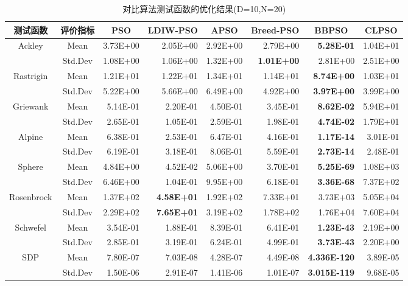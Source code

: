 \begin{table}[htbp]
	\renewcommand\arraystretch{1.1}
	\centering
	\caption{对比算法测试函数的优化结果(D=10,N=20)}
	\label{tabResult1}
	\begin{tabular}{ccrrrrrr}
		\toprule[1.5pt]
		\textbf{测试函数}  & \textbf{评价指标}  & \multicolumn{1}{c}{\textbf{PSO}} & \multicolumn{1}{c}{\textbf{LDIW-PSO}} & \multicolumn{1}{c}{\textbf{APSO}} & \multicolumn{1}{c}{\textbf{Breed-PSO}} & \multicolumn{1}{c}{\textbf{BBPSO}} & \multicolumn{1}{c}{\textbf{CLPSO}} \\
		\midrule[1pt]
		Ackley & Mean  & 3.73E+00 & 2.05E+00 & 2.92E+00 & 2.79E+00 & \textbf{5.28E-01} & 1.04E+01 \\
		& Std.Dev & 1.08E+00 & 1.06E+00 & 1.32E+00 & \textbf{1.01E+00} & 2.81E+00 & 2.51E+00 \\
		Rastrigin & Mean  & 1.21E+01 & 1.22E+01 & 1.34E+01 & 1.14E+01 & \textbf{8.74E+00} & 1.03E+01 \\
		& Std.Dev & 5.22E+00 & 5.66E+00 & 6.49E+00 & 4.92E+00 & \textbf{3.97E+00} & 3.99E+00 \\
		Griewank & Mean  & 5.14E-01 & 2.20E-01 & 4.50E-01 & 3.45E-01 & \textbf{8.62E-02} & 5.94E+01 \\
		& Std.Dev & 2.65E-01 & 1.05E-01 & 2.59E-01 & 1.98E-01 & \textbf{4.74E-02} & 1.79E+01 \\
		Alpine & Mean  & 6.38E-01 & 2.53E-01 & 6.47E-01 & 4.16E-01 & \textbf{1.17E-14} & 3.01E-01 \\
		& Std.Dev & 6.19E-01 & 3.18E-01 & 8.06E-01 & 5.59E-01 & \textbf{2.73E-14} & 2.48E-01 \\
		Sphere & Mean  & 4.84E+00 & 4.52E-02 & 5.06E+00 & 3.70E-01 & \textbf{5.25E-69} & 1.08E+03 \\
		& Std.Dev & 6.46E+00 & 1.04E-01 & 9.95E+00 & 6.18E-01 & \textbf{3.36E-68} & 7.37E+02 \\
		Rosenbrock & Mean  & 1.37E+02 & \textbf{4.58E+01} & 1.92E+02 & 7.33E+01 & 3.73E+03 & 5.05E+04 \\
		& Std.Dev & 2.29E+02 & \textbf{7.65E+01} & 3.19E+02 & 1.78E+02 & 1.76E+04 & 7.60E+04 \\
		Schwefel & Mean  & 3.54E-01 & 1.88E-01 & 8.39E-01 & 6.41E-01 & \textbf{1.23E-43} & 2.19E+00 \\
		& Std.Dev & 2.85E-01 & 3.19E-01 & 6.24E-01 & 4.99E-01 & \textbf{3.73E-43} & 2.20E+00 \\
		SDP   & Mean  & 7.80E-07 & 7.03E-08 & 4.28E-07 & 4.49E-08 & \textbf{4.336E-120} & 3.89E-05 \\
		& Std.Dev & 1.50E-06 & 2.91E-07 & 1.41E-06 & 1.01E-07 & \textbf{3.015E-119} & 9.68E-05 \\
		\bottomrule[1.5pt]
	\end{tabular}%
\end{table}%

